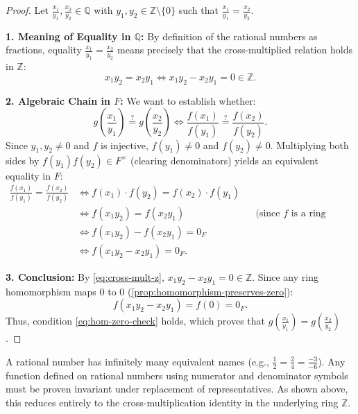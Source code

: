 \begin{content}

\begin{proof}
Let $\frac{x_1}{y_1}, \frac{x_2}{y_2} \in \mathbb{Q}$ with $y_1, y_2 \in \mathbb{Z} \setminus \{0\}$ such that $\frac{x_1}{y_1} = \frac{x_2}{y_2}$.

\textbf{1. Meaning of Equality in $\mathbb{Q}$:}
By definition of the rational numbers as fractions, equality $\frac{x_1}{y_1} = \frac{x_2}{y_2}$ means precisely that the cross-multiplied relation holds in $\mathbb{Z}$:
\begin{equation}\label{eq:cross-mult-z}
x_1 y_2 = x_2 y_1 \iff x_1 y_2 - x_2 y_1 = 0 \in \mathbb{Z}.
\end{equation}

\textbf{2. Algebraic Chain in $F$:}
We want to establish whether:
\[
g\left(\frac{x_1}{y_1}\right) \overset{?}{=} g\left(\frac{x_2}{y_2}\right) \iff \frac{f(x_1)}{f(y_1)} \overset{?}{=} \frac{f(x_2)}{f(y_2)}.
\]
Since $y_1, y_2 \ne 0$ and $f$ is injective, $f(y_1) \ne 0$ and $f(y_2) \ne 0$. Multiplying both sides by $f(y_1)f(y_2) \in F^\times$ (clearing denominators) yields an equivalent equality in $F$:
\begin{align}
\frac{f(x_1)}{f(y_1)} = \frac{f(x_2)}{f(y_2)} &\iff f(x_1) \cdot f(y_2) = f(x_2) \cdot f(y_1) \nonumber \\
&\iff f(x_1 y_2) = f(x_2 y_1) && \text{(since $f$ is a ring homomorphism)} \nonumber \\
&\iff f(x_1 y_2) - f(x_2 y_1) = 0_F \nonumber \\
&\iff f(x_1 y_2 - x_2 y_1) = 0_F. \label{eq:hom-zero-check}
\end{align}

\textbf{3. Conclusion:}
By \eqref{eq:cross-mult-z}, $x_1 y_2 - x_2 y_1 = 0 \in \mathbb{Z}$. Since any ring homomorphism maps $0$ to $0$ (\cref{prop:homomorphism-preserves-zero}):
\[
f(x_1 y_2 - x_2 y_1) = f(0) = 0_F.
\]
Thus, condition \eqref{eq:hom-zero-check} holds, which proves that $g\left(\frac{x_1}{y_1}\right) = g\left(\frac{x_2}{y_2}\right)$.
\end{proof}

\begin{steps}
A rational number has infinitely many equivalent names (e.g., $\frac{1}{2} = \frac{2}{4} = \frac{-3}{-6}$). Any function defined on rational numbers using numerator and denominator symbols must be proven invariant under replacement of representatives. As shown above, this reduces entirely to the cross-multiplication identity in the underlying ring $\mathbb{Z}$.
\end{steps}
\end{content}

